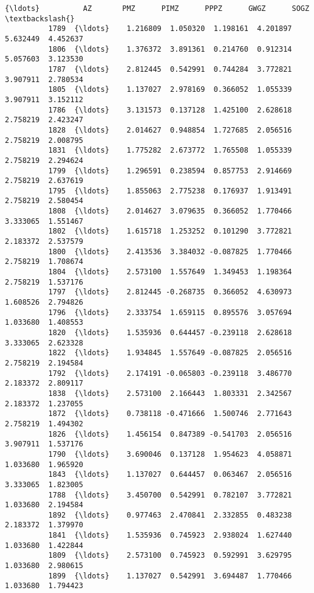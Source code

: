 \documentclass[11pt]{article}
\begin{document}
\begin{Verbatim}[commandchars=\\\{\}]
                {\ldots}          AZ       PMZ      PIMZ      PPPZ      GWGZ      SOGZ  \textbackslash{}
          1789  {\ldots}    1.216809  1.050320  1.198161  4.201897  5.632449  4.452637   
          1806  {\ldots}    1.376372  3.891361  0.214760  0.912314  5.057603  3.123530   
          1787  {\ldots}    2.812445  0.542991  0.744284  3.772821  3.907911  2.780534   
          1805  {\ldots}    1.137027  2.978169  0.366052  1.055339  3.907911  3.152112   
          1786  {\ldots}    3.131573  0.137128  1.425100  2.628618  2.758219  2.423247   
          1828  {\ldots}    2.014627  0.948854  1.727685  2.056516  2.758219  2.008795   
          1831  {\ldots}    1.775282  2.673772  1.765508  1.055339  2.758219  2.294624   
          1799  {\ldots}    1.296591  0.238594  0.857753  2.914669  2.758219  2.637619   
          1795  {\ldots}    1.855063  2.775238  0.176937  1.913491  2.758219  2.580454   
          1808  {\ldots}    2.014627  3.079635  0.366052  1.770466  3.333065  1.551467   
          1802  {\ldots}    1.615718  1.253252  0.101290  3.772821  2.183372  2.537579   
          1800  {\ldots}    2.413536  3.384032 -0.087825  1.770466  2.758219  1.708674   
          1804  {\ldots}    2.573100  1.557649  1.349453  1.198364  2.758219  1.537176   
          1797  {\ldots}    2.812445 -0.268735  0.366052  4.630973  1.608526  2.794826   
          1796  {\ldots}    2.333754  1.659115  0.895576  3.057694  1.033680  1.408553   
          1820  {\ldots}    1.535936  0.644457 -0.239118  2.628618  3.333065  2.623328   
          1822  {\ldots}    1.934845  1.557649 -0.087825  2.056516  2.758219  2.194584   
          1792  {\ldots}    2.174191 -0.065803 -0.239118  3.486770  2.183372  2.809117   
          1838  {\ldots}    2.573100  2.166443  1.803331  2.342567  2.183372  1.237055   
          1872  {\ldots}    0.738118 -0.471666  1.500746  2.771643  2.758219  1.494302   
          1826  {\ldots}    1.456154  0.847389 -0.541703  2.056516  3.907911  1.537176   
          1790  {\ldots}    3.690046  0.137128  1.954623  4.058871  1.033680  1.965920   
          1843  {\ldots}    1.137027  0.644457  0.063467  2.056516  3.333065  1.823005   
          1788  {\ldots}    3.450700  0.542991  0.782107  3.772821  1.033680  2.194584   
          1892  {\ldots}    0.977463  2.470841  2.332855  0.483238  2.183372  1.379970   
          1841  {\ldots}    1.535936  0.745923  2.938024  1.627440  1.033680  1.422844   
          1809  {\ldots}    2.573100  0.745923  0.592991  3.629795  1.033680  2.980615   
          1899  {\ldots}    1.137027  0.542991  3.694487  1.770466  1.033680  1.794423   

\end{Verbatim}
\end{document}
